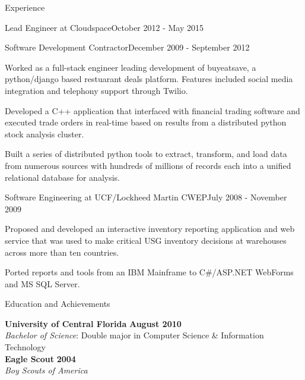 \documentclass{resume} %
\begin{document}
\begin{rSection}{Experience}
\begin{rSubsection}{Lead Engineer at Cloudspace}{October 2012 - May 2015}{}{}
\end{rSubsection}


\begin{rSubsection}{Software Development Contractor}{December 2009 - September 2012}{}{}

\item Worked as a full-stack engineer leading development of buyeatsave, a python/django based restuarant deals platform.  Features included social media integration and telephony support through Twilio.
\item Developed a C++ application that interfaced with financial trading software and executed trade orders in real-time based on results from a distributed python stock analysis cluster.
\item Built a series of distributed python tools to extract, transform, and load data from numerous sources with hundreds of millions of records each into a unified relational database for analysis.


\end{rSubsection}


\begin{rSubsection}{Software Engineering at UCF/Lockheed Martin CWEP}{July 2008 - November 2009}{}{}

\item Proposed and developed an interactive inventory reporting application and web service that was used to make critical USG inventory decisions at warehouses across more than ten countries.
\item Ported reports and tools from an IBM Mainframe to C\#/ASP.NET WebForms and MS SQL Server.

\end{rSubsection}


\end{rSection}


\begin{rSection}{Education and Achievements}

{\bf University of Central Florida} \hfill {\bf August 2010} \\ 
\textit{Bachelor of Science}: Double major in Computer Science \& Information Technology \\
{\bf Eagle Scout} \hfill {\bf 2004} \\ 
\textit{Boy Scouts of America} \\
\end{rSection}
\end{document}
